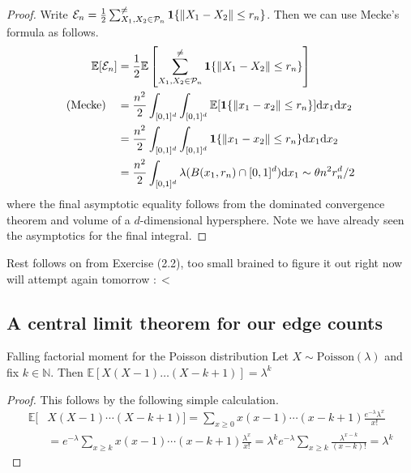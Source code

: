 \documentclass{article}
\begin{document}
\begin{proof}
Write $\mathcal{E}_n = \frac{1}{2}\sum_{X_1, X_2 \in \mathcal{P}_n}^{\neq}{\bf 1}\{\lVert X_1 - X_2 \rVert \leq r_n\}$. Then 
we can use Mecke's formula as follows. 
\begin{align*}
    \mathbb{E}[\mathcal{E}_n] &= \frac{1}{2}\mathbb{E}\left[\sum_{X_1, X_2 \in \mathcal{P}_n}^{\neq}{\bf 1}\{\lVert X_1 - X_2 \rVert \leq r_n\}\right] \\
    (\text{Mecke}) \quad &= \frac{n^2}{2}\int_{[0,1]^d}\int_{[0,1]^d}\mathbb{E}[{\bf 1}\{\lVert x_1 - x_2 \rVert \leq r_n\}]\mathrm{d}x_1\mathrm{d}x_2 \\
    &= \frac{n^2}{2}\int_{[0,1]^d}\int_{[0,1]^d}{\bf 1}\{\lVert x_1 - x_2 \rVert \leq r_n\}\mathrm{d}x_1\mathrm{d}x_2 \\
    &= \frac{n^2}{2}\int_{[0,1]^d}\lambda(B(x_1, r_n) \cap [0,1]^d)\mathrm{d}x_1 \sim \theta n^2 r_n^d / 2
\end{align*}
where the final asymptotic equality follows from the dominated convergence theorem and volume of a $d$-dimensional 
hypersphere. Note we have already seen the asymptotics for the final integral.
\end{proof}

Rest follows on from Exercise (2.2), too small brained to figure it out right now will attempt again tomorrow $:<$

\subsection{A central limit theorem for our edge counts}

\begin{lemma}[]{Falling factorial moment for the Poisson distribution}
    Let $X \sim \text{Poisson}(\lambda)$ and fix $k \in \mathbb{N}$. Then $\mathbb{E}[X(X-1)\dots (X-k+1)] = \lambda^k$
\end{lemma}

\begin{proof}
    This follows by the following simple calculation.
    \begin{align*}
        \mathbb{E}[&X(X-1)\cdots (X - k + 1)] = \sum_{x \geq 0}x(x-1)\cdots (x-k+1)\frac{e^{-\lambda}\lambda^x}{x!} \\ 
        &= e^{-\lambda}\sum_{x \geq k}x(x-1)\cdots (x-k+1)\frac{\lambda^x}{x!} = \lambda^ke^{-\lambda}\sum_{x \geq k}
        \frac{\lambda^{x-k}}{(x-k)!} = \lambda^k
    \end{align*}
\end{proof}
\end{document}
